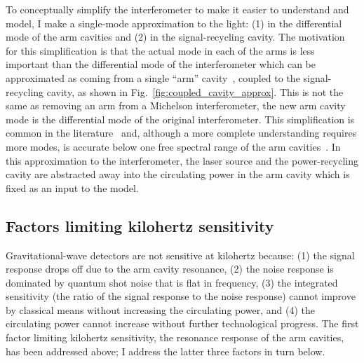 To conceptually simplify the interferometer to make it easier to understand and model, I make a single-mode approximation to the light: (1) in the differential mode of the arm cavities and (2) in the signal-recycling cavity. %
The motivation for this simplification is that the actual mode in each of the arms is less important than the differential mode of the interferometer which can be approximated as coming from a single ``arm'' cavity~\cite{}, coupled to the signal-recycling cavity, as shown in Fig.~\ref{fig:coupled_cavity_approx}. This is not the same as removing an arm from a Michelson interferometer, the new arm cavity mode is the differential mode of the original interferometer. 
This simplification is common in the literature~\cite{Korobko2019,Adya2020} and, although a more complete understanding requires more modes, is accurate below one free spectral range of the arm cavities~\cite{Miaoetal2015,}. In this approximation to the interferometer, the laser source and the power-recycling cavity are abstracted away into the circulating power in the arm cavity which is fixed as an input to the model.


\subsection{Factors limiting kilohertz sensitivity}
\label{sec:intro_factors_limiting_kHz}

Gravitational-wave detectors are not sensitive at kilohertz because: (1) the signal response drops off due to the arm cavity resonance, (2) the noise response is dominated by quantum shot noise that is flat in frequency, (3) the integrated sensitivity (the ratio of the signal response to the noise response) cannot improve by classical means without increasing the circulating power, and (4) the circulating power cannot increase without further technological progress.
The first factor limiting kilohertz sensitivity, the resonance response of the arm cavities, has been addressed above; I address the latter three factors in turn below.


